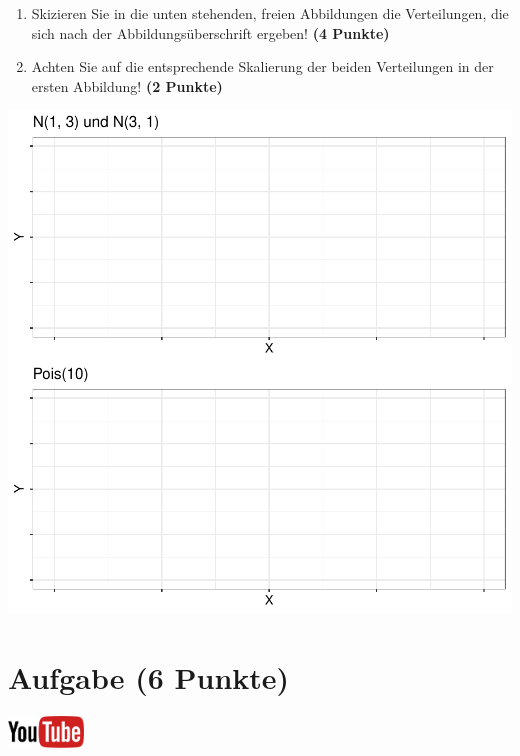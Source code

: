\documentclass[a4paper, 10pt]{scrartcl}\usepackage[]{graphicx}\usepackage[]{xcolor}
\makeatletter
\def\maxwidth{ %
  \ifdim\Gin@nat@width>\linewidth
    \linewidth
  \else
    \Gin@nat@width
  \fi
}
\makeatother
\begin{document}
\begin{enumerate}
\item Skizieren Sie in die unten stehenden, freien Abbildungen die
  Verteilungen, die sich nach der Abbildungs{\"u}berschrift ergeben! \textbf{(4
    Punkte)}
\item Achten Sie auf die entsprechende Skalierung der beiden Verteilungen
  in der ersten Abbildung! \textbf{(2 Punkte)}
\end{enumerate}



{\centering \includegraphics[width=\maxwidth]{img/histogram-01-1} 

}



 
\clearpage

\section{Aufgabe \hfill (6 Punkte)}

\hfill\href{https://youtu.be/ZrJhn2wPbq4}{\includegraphics[width =
  2cm]{img/youtube}}\\[1Ex]
\end{document}
